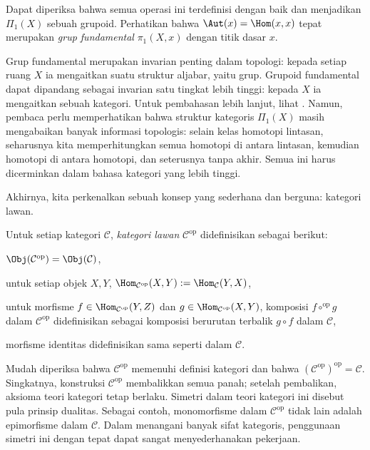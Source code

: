 \begin{example}
	Dapat diperiksa bahwa semua operasi ini terdefinisi dengan baik dan menjadikan $\Pi_1(X)$ sebuah grupoid. Perhatikan bahwa $\Aut(x) = \Hom(x,x)$ tepat merupakan \emph{grup fundamental} $\pi_1(X, x)$ dengan titik dasar $x$.

	Grup fundamental merupakan invarian penting dalam topologi: kepada setiap ruang $X$ ia mengaitkan suatu struktur aljabar, yaitu grup. Grupoid fundamental dapat dipandang sebagai invarian satu tingkat lebih tinggi: kepada $X$ ia mengaitkan sebuah kategori. Untuk pembahasan lebih lanjut, lihat \cite[Bab 2]{May99}. Namun, pembaca perlu memperhatikan bahwa struktur kategoris $\Pi_1(X)$ masih mengabaikan banyak informasi topologis: selain kelas homotopi lintasan, seharusnya kita memperhitungkan semua homotopi di antara lintasan, kemudian homotopi di antara homotopi, dan seterusnya tanpa akhir. Semua ini harus dicerminkan dalam bahasa kategori yang lebih tinggi.
\end{example}

Akhirnya, kita perkenalkan sebuah konsep yang sederhana dan berguna: kategori lawan.
\begin{definition}
	Untuk setiap kategori $\mathcal{C}$, \emph{kategori lawan} $\mathcal{C}^\text{op}$ didefinisikan sebagai berikut:
	\begin{compactitem}
		\item $\Obj(\mathcal{C}^{\text{op}}) = \Obj(\mathcal{C})$,
		\item untuk setiap objek $X,Y$, $\Hom_{\mathcal{C}^{\text{op}}}(X, Y) := \Hom_{\mathcal{C}}(Y, X)$,
		\item untuk morfisme $f \in \Hom_{\mathcal{C}^{\text{op}}}(Y, Z)$ dan $g \in \Hom_{\mathcal{C}^{\text{op}}}(X, Y)$, komposisi $f \circ^\text{op} g$ dalam $\mathcal{C}^{\text{op}}$ didefinisikan sebagai komposisi berurutan terbalik $g \circ f$ dalam $\mathcal{C}$,
		\item morfisme identitas didefinisikan sama seperti dalam $\mathcal{C}$.
	\end{compactitem}
\end{definition}
Mudah diperiksa bahwa $\mathcal{C}^\text{op}$ memenuhi definisi kategori dan bahwa $(\mathcal{C}^\text{op})^{\text{op}} = \mathcal{C}$. Singkatnya, konstruksi $\mathcal{C}^\text{op}$ membalikkan semua panah; setelah pembalikan, aksioma teori kategori tetap berlaku. Simetri dalam teori kategori ini disebut pula prinsip dualitas. Sebagai contoh, monomorfisme dalam $\mathcal{C}^\text{op}$ tidak lain adalah epimorfisme dalam $\mathcal{C}$. Dalam menangani banyak sifat kategoris, penggunaan simetri ini dengan tepat dapat sangat menyederhanakan pekerjaan.

